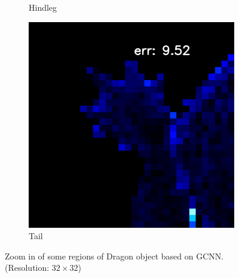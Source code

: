 \begin{figure}[th]
\begin{subfigure}[b]{0.18\linewidth}
		\caption{Hindleg}
	\end{subfigure}
	\begin{subfigure}[b]{0.18\linewidth}
		\includegraphics[width=\linewidth]{./Figures/gcnn_synthetic/eval_7_12_-48_error.png}
		\caption{Tail}
	\end{subfigure}
	\decoRule
	\caption{Zoom in of some regions of Dragon object based on GCNN. (Resolution: $ 32\times32 $)}
	\label{fig:gcnn-eval-synthetic-zoom-in}
\end{figure}


